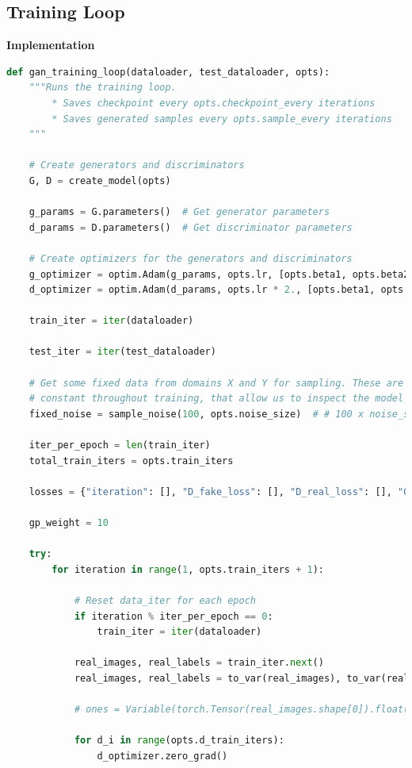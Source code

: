 \documentclass{article}
\begin{document}
	\subsection{Training Loop}
	\textbf{Implementation}
	\begin{lstlisting}[language=python]
def gan_training_loop(dataloader, test_dataloader, opts):
    """Runs the training loop.
        * Saves checkpoint every opts.checkpoint_every iterations
        * Saves generated samples every opts.sample_every iterations
    """

    # Create generators and discriminators
    G, D = create_model(opts)

    g_params = G.parameters()  # Get generator parameters
    d_params = D.parameters()  # Get discriminator parameters

    # Create optimizers for the generators and discriminators
    g_optimizer = optim.Adam(g_params, opts.lr, [opts.beta1, opts.beta2])
    d_optimizer = optim.Adam(d_params, opts.lr * 2., [opts.beta1, opts.beta2])

    train_iter = iter(dataloader)

    test_iter = iter(test_dataloader)

    # Get some fixed data from domains X and Y for sampling. These are images that are held
    # constant throughout training, that allow us to inspect the model's performance.
    fixed_noise = sample_noise(100, opts.noise_size)  # # 100 x noise_size x 1 x 1

    iter_per_epoch = len(train_iter)
    total_train_iters = opts.train_iters

    losses = {"iteration": [], "D_fake_loss": [], "D_real_loss": [], "G_loss": []}

    gp_weight = 10

    try:
        for iteration in range(1, opts.train_iters + 1):

            # Reset data_iter for each epoch
            if iteration % iter_per_epoch == 0:
                train_iter = iter(dataloader)

            real_images, real_labels = train_iter.next()
            real_images, real_labels = to_var(real_images), to_var(real_labels).long().squeeze()

            # ones = Variable(torch.Tensor(real_images.shape[0]).float().cuda().fill_(1.0), requires_grad=False)

            for d_i in range(opts.d_train_iters):
                d_optimizer.zero_grad()


\end{lstlisting}
\end{document}
